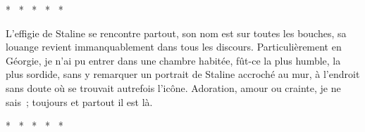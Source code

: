 \documentclass[french,twoside]{book} %
\begin{document}
\begin{center}
\noindent \centerline{*  *  *  *  *}\par
\end{center}

\noindent L’effigie de Staline se rencontre partout, son nom est sur toutes les bouches, sa louange revient immanquablement dans tous les discours. Particulièrement en Géorgie, je n’ai pu entrer dans une chambre habitée, fût-ce la plus humble, la plus sordide, sans y remarquer un portrait de Staline accroché au mur, à l’endroit sans doute où se trouvait autrefois l’icône. Adoration, amour ou crainte, je ne sais ; toujours et partout il est là.\par

\begin{center}
\noindent \centerline{*  *  *  *  *}\par
\end{center}
\end{document}
